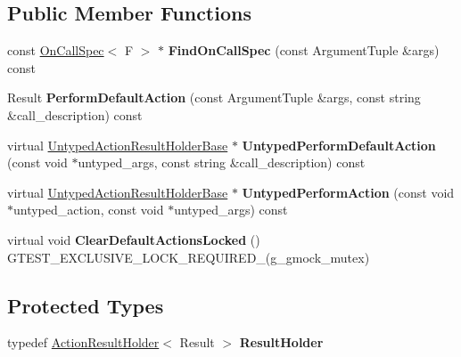 \subsection*{Public Member Functions}
\begin{DoxyCompactItemize}
\item 
\mbox{\label{classtesting_1_1internal_1_1_function_mocker_base_a3bcd2e8191ffc44bd59b8d8d25eefd3e}} 
const \mbox{\hyperlink{classtesting_1_1internal_1_1_on_call_spec}{On\+Call\+Spec}}$<$ F $>$ $\ast$ {\bfseries Find\+On\+Call\+Spec} (const Argument\+Tuple \&args) const
\item 
\mbox{\label{classtesting_1_1internal_1_1_function_mocker_base_adbef6e1af840c9c14c3a6acee01007b2}} 
Result {\bfseries Perform\+Default\+Action} (const Argument\+Tuple \&args, const string \&call\+\_\+description) const
\item 
\mbox{\label{classtesting_1_1internal_1_1_function_mocker_base_aed1c6248ba1b50437ee3a5f72c5f7bf3}} 
virtual \mbox{\hyperlink{classtesting_1_1internal_1_1_untyped_action_result_holder_base}{Untyped\+Action\+Result\+Holder\+Base}} $\ast$ {\bfseries Untyped\+Perform\+Default\+Action} (const void $\ast$untyped\+\_\+args, const string \&call\+\_\+description) const
\item 
\mbox{\label{classtesting_1_1internal_1_1_function_mocker_base_aebdb11fe4ea9e9f3984cbcd58c6f6cf9}} 
virtual \mbox{\hyperlink{classtesting_1_1internal_1_1_untyped_action_result_holder_base}{Untyped\+Action\+Result\+Holder\+Base}} $\ast$ {\bfseries Untyped\+Perform\+Action} (const void $\ast$untyped\+\_\+action, const void $\ast$untyped\+\_\+args) const
\item 
\mbox{\label{classtesting_1_1internal_1_1_function_mocker_base_ada818fcb2b892f21bb939def386599e7}} 
virtual void {\bfseries Clear\+Default\+Actions\+Locked} () G\+T\+E\+S\+T\+\_\+\+E\+X\+C\+L\+U\+S\+I\+V\+E\+\_\+\+L\+O\+C\+K\+\_\+\+R\+E\+Q\+U\+I\+R\+E\+D\+\_\+(g\+\_\+gmock\+\_\+mutex)
\end{DoxyCompactItemize}
\subsection*{Protected Types}
\begin{DoxyCompactItemize}
\item 
\mbox{\label{classtesting_1_1internal_1_1_function_mocker_base_aa4e1b2ee217676c9e70c3006b19a8074}} 
typedef \mbox{\hyperlink{classtesting_1_1internal_1_1_action_result_holder}{Action\+Result\+Holder}}$<$ Result $>$ {\bfseries Result\+Holder}
\end{DoxyCompactItemize}
